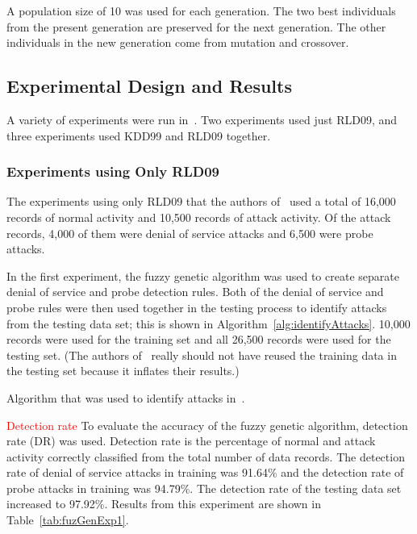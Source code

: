 \documentclass{sig-alternate}
\newcommand{\mycomment}[1]{\textcolor{red}{#1}}
\begin{document}
A population size of 10 was used for each generation. The two best individuals from the present generation are preserved for the next generation. The other individuals in the new generation come from mutation and crossover.




\subsection{Experimental Design and Results}
A variety of experiments were run in~\cite{6496342, 6559603}. Two experiments used just RLD09, and three experiments used KDD99 and RLD09 together.

\subsubsection{Experiments using Only RLD09}
The experiments using only RLD09 that the authors of~\cite{6496342} used a total of 16,000 records of normal activity and 10,500 records of attack activity. Of the attack records, 4,000 of them were denial of service attacks and 6,500 were probe attacks.

In the first experiment, the fuzzy genetic algorithm was used to create separate denial of service and probe detection rules. Both of the denial of service and probe rules were then used together in the testing process to identify attacks from the testing data set; this is shown in Algorithm~\ref{alg:identifyAttacks}. 10,000 records were used for the training set and all 26,500 records were used for the testing set. (The authors of~\cite{6496342} really should not have reused the training data in the testing set because it inflates their results.)

\begin{algorithm}[t]
\caption{Algorithm that was used to identify attacks in~\cite{6496342}.}
\label{alg:identifyAttacks}
\begin{algorithmic}
\ELSE {}
\ENDIF
\end{algorithmic}
\end{algorithm}

\mycomment{Detection rate} To evaluate the accuracy of the fuzzy genetic algorithm, detection rate (DR) was used. Detection rate is the percentage of normal and attack activity correctly classified from the total number of data records. The detection rate of denial of service attacks in training was 91.64\% and the detection rate of probe attacks in training was 94.79\%. The detection rate of the testing data set increased to 97.92\%. Results from this experiment are shown in Table~\ref{tab:fuzGenExp1}.
\end{document}
